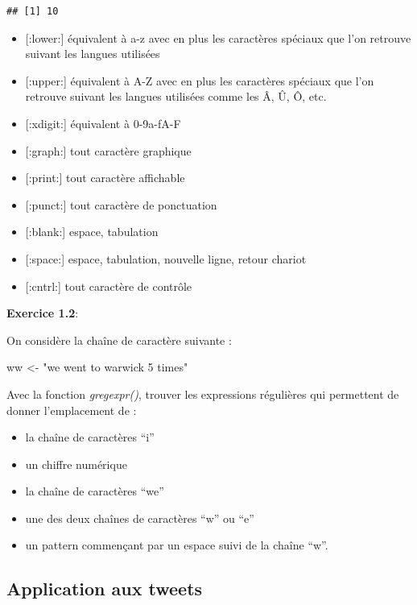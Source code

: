 \documentclass[
]{book}
\newenvironment{Shaded}{\begin{snugshade}}{\end{snugshade}}
\newcommand{\NormalTok}[1]{#1}
\newcommand{\OtherTok}[1]{\textcolor[rgb]{0.56,0.35,0.01}{#1}}
\newcommand{\StringTok}[1]{\textcolor[rgb]{0.31,0.60,0.02}{#1}}
\providecommand{\tightlist}{%
  \setlength{\itemsep}{0pt}\setlength{\parskip}{0pt}}
\theoremstyle{definition}
\theoremstyle{definition}
\theoremstyle{definition}
\theoremstyle{definition}
\theoremstyle{remark}
\begin{document}
\begin{verbatim}
## [1] 10
\end{verbatim}

\begin{itemize}
\item
  {[}:lower:{]} équivalent à a-z avec en plus les caractères spéciaux que l'on retrouve suivant les langues utilisées
\item
  {[}:upper:{]} équivalent à A-Z avec en plus les caractères spéciaux que l'on retrouve suivant les langues utilisées comme les Â, Û, Ô, etc.
\item
  {[}:xdigit:{]} équivalent à 0-9a-fA-F
\item
  {[}:graph:{]} tout caractère graphique
\item
  {[}:print:{]} tout caractère affichable
\item
  {[}:punct:{]} tout caractère de ponctuation
\item
  {[}:blank:{]} espace, tabulation
\item
  {[}:space:{]} espace, tabulation, nouvelle ligne, retour chariot
\item
  {[}:cntrl:{]} tout caractère de contrôle
\end{itemize}

\textbf{Exercice 1.2}:

On considère la chaîne de caractère suivante :

\begin{Shaded}
\begin{Highlighting}[]
\NormalTok{ww }\OtherTok{\textless{}{-}} \StringTok{"we went to warwick 5 times"}
\end{Highlighting}
\end{Shaded}

Avec la fonction \emph{gregexpr()}, trouver les expressions régulières qui permettent de donner l'emplacement de :

\begin{itemize}
\tightlist
\item
  la chaîne de caractères ``i''
\item
  un chiffre numérique
\item
  la chaîne de caractères ``we''
\item
  une des deux chaînes de caractères ``w'' ou ``e''
\item
  un pattern commençant par un espace suivi de la chaîne ``w''.
\end{itemize}

\hypertarget{application-aux-tweets}{%
\subsection{Application aux tweets}\label{application-aux-tweets}}
\end{document}
